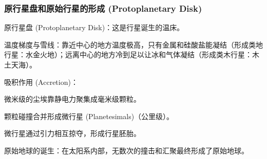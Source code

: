 \documentclass[12pt,a4paper]{article}
\begin{document}
	\subsubsection{原行星盘和原始行星的形成 (Protoplanetary Disk)}
		原行星盘 (Protoplanetary Disk)：这是行星诞生的温床。
		
		温度梯度与雪线：靠近中心的地方温度极高，只有金属和硅酸盐能凝结（形成类地行星：水金火地）；远离中心的地方冷到足以让冰和气体凝结（形成类木行星：木土天海）。
		
		吸积作用 (Accretion)：
		
		微米级的尘埃靠静电力聚集成毫米级颗粒。
		
		颗粒碰撞合并形成微行星 (Planetesimals)（公里级）。
		
		微行星通过引力相互掠夺，形成行星胚胎。
		
		原始地球的诞生：在太阳系内部，无数次的撞击和汇聚最终形成了原始地球。
\end{document}
